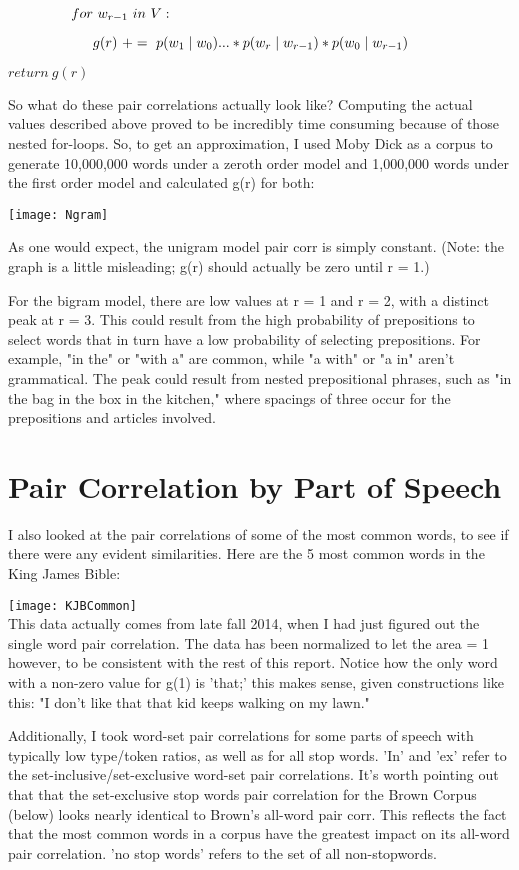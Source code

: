 \documentclass[11pt,letterpaper]{article}
\theoremstyle{definition}
\begin{document}
$\indent \indent \indent for\ w_{r-1}\ in\ V:$

$\indent \indent \indent \indent g(r)\ +=\  p(w_1 \mid w_0) ... * p(w_r \mid w_{r-1}) * p(w_0 \mid w_{r-1})$

$return\ g(r)$
\[\]

So what do these pair correlations actually look like? Computing the actual values described above proved to be incredibly time consuming because of those nested for-loops. So, to get an approximation, I used Moby Dick as a corpus to generate 10,000,000 words under a zeroth order model and 1,000,000 words under the first order model and calculated g(r) for both:

\texttt{[image: Ngram]}

As one would expect, the unigram model pair corr is simply constant. (Note: the graph is a little misleading; g(r) should actually be zero until r = 1.)

For the bigram model, there are low values at r = 1 and r = 2, with a distinct peak at r = 3. This could result from the high probability of prepositions to select words that in turn have a low probability of selecting prepositions. For example, "in the" or "with a" are common, while "a with" or "a in" aren't grammatical. The peak could result from nested prepositional phrases, such as "in the bag in the box in the kitchen," where spacings of three occur for the prepositions and articles involved.

\section{Pair Correlation by Part of Speech}

I also looked at the pair correlations of some of the most common words, to see if there were any evident similarities. Here are the 5 most common words in the King James Bible:

\texttt{[image: KJBCommon]}
\[\]
This data actually comes from late fall 2014, when I had just figured out the single word pair correlation. The data has been normalized to let the area = 1 however, to be consistent with the rest of this report. Notice how the only word with a non-zero value for g(1) is 'that;' this makes sense, given constructions like this: "I don't like that that kid keeps walking on my lawn." 

Additionally, I took word-set pair correlations for some parts of speech with typically low type/token ratios, as well as for all stop words. 'In' and 'ex' refer to the set-inclusive/set-exclusive word-set pair correlations. It's worth pointing out that that the set-exclusive stop words pair correlation for the Brown Corpus (below) looks nearly identical to Brown's all-word pair corr. This reflects the fact that the most common words in a corpus have the greatest impact on its all-word pair correlation. 'no stop words' refers to the set of all non-stopwords.
\end{document}
